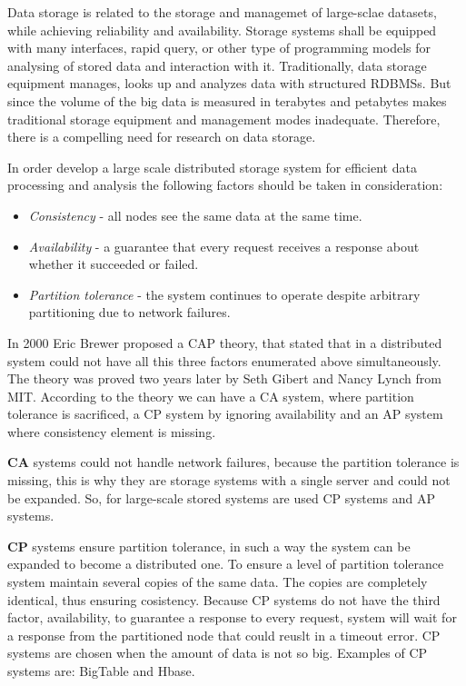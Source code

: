 Data storage is related to the storage and managemet of large-sclae datasets, while achieving reliability and availability. Storage systems shall be equipped with many interfaces, rapid query, or other type of programming models for analysing of stored data and interaction with it. Traditionally, data storage equipment manages, looks up and analyzes data with structured RDBMSs. But since the volume of the big data is measured in terabytes and petabytes makes traditional storage equipment and management modes inadequate. Therefore, there is a compelling need for research on data storage.\cite{bdtech}

In order develop a large scale distributed storage system for  efficient data processing and analysis the following factors should be taken in consideration:\cite{CAP}

\begin{itemize}

\item \textit{Consistency} - all nodes see the same data at the same time.
\item \textit{Availability} - a guarantee that every request receives a response about whether it succeeded or failed.
\item \textit{Partition tolerance} - the system continues to operate despite arbitrary partitioning due to network failures.

\end{itemize}

In 2000 Eric Brewer proposed a CAP theory, that stated that in a distributed system could not have all this three factors enumerated above simultaneously. The theory was proved two years later by Seth Gibert and Nancy Lynch from MIT. According to the theory we can have a CA system, where partition tolerance is sacrificed, a CP system by ignoring availability and an AP system where consistency element is missing.

\textbf{CA} systems could not handle network failures, because the partition tolerance is missing, this is why they are storage systems with a single server and could not be expanded. So, for large-scale stored systems are used CP systems and AP systems. 

\textbf{CP} systems ensure partition tolerance, in such a way the system can be expanded to become a distributed one. To ensure a level of partition tolerance system maintain several copies of the same data. The copies are completely identical, thus ensuring cosistency. Because CP systems do not have the third factor, availability, to guarantee a response to every request, system will wait for a response from the partitioned node that could reuslt in a timeout error. CP systems are chosen when the amount of data is not so big. Examples of CP systems are: BigTable and Hbase.


